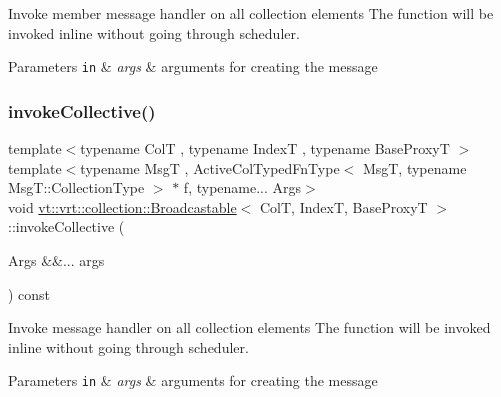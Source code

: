 Invoke member message handler on all collection elements The function will be invoked inline without going through scheduler. 


\begin{DoxyParams}[1]{Parameters}
\mbox{\tt in}  & {\em args} & arguments for creating the message \\
\hline
\end{DoxyParams}
\mbox{\label{structvt_1_1vrt_1_1collection_1_1_broadcastable_a3acc97a928f8d184e54d696e49377008}} 
\subsubsection{\texorpdfstring{invoke\+Collective()}{invokeCollective()}\hspace{0.1cm}{\footnotesize\ttfamily [2/2]}}
{\footnotesize\ttfamily template$<$typename ColT , typename IndexT , typename Base\+ProxyT $>$ \\
template$<$typename MsgT , Active\+Col\+Typed\+Fn\+Type$<$ Msg\+T, typename Msg\+T\+::\+Collection\+Type $>$ $\ast$ f, typename... Args$>$ \\
void \hyperlink{structvt_1_1vrt_1_1collection_1_1_broadcastable}{vt\+::vrt\+::collection\+::\+Broadcastable}$<$ ColT, IndexT, Base\+ProxyT $>$\+::invoke\+Collective (\begin{DoxyParamCaption}\item[{Args \&\&...}]{args }\end{DoxyParamCaption}) const}



Invoke message handler on all collection elements The function will be invoked inline without going through scheduler. 


\begin{DoxyParams}[1]{Parameters}
\mbox{\tt in}  & {\em args} & arguments for creating the message \\
\hline
\end{DoxyParams}
\mbox{\label{structvt_1_1vrt_1_1collection_1_1_broadcastable_a40df56c587e61448857f71acedce53bc}} 

